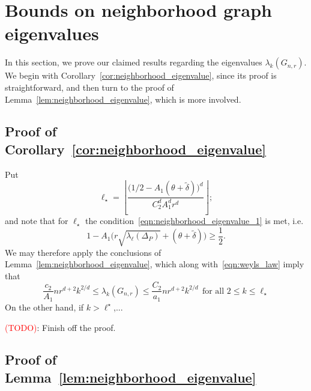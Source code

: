 \documentclass[twoside]{article}
\newcommand{\floor}[1]{\left\lfloor #1 \right\rfloor}
\newcommand{\1}{\mathbf{1}}
\newcommand{\wt}[1]{\widetilde{#1}}
\theoremstyle{definition}
\theoremstyle{remark}
\begin{document}
\section{Bounds on neighborhood graph eigenvalues}
\label{sec:graph_eigenvalues}
In this section, we prove our claimed results regarding the eigenvalues $\lambda_k(G_{n,r})$. We begin with Corollary~\ref{cor:neighborhood_eigenvalue}, since its proof is straightforward, and then turn to the proof of Lemma~\ref{lem:neighborhood_eigenvalue}, which is more involved.

\subsection{Proof of Corollary~\ref{cor:neighborhood_eigenvalue}}
Put
\begin{equation*}
\ell_{\star} = \floor{\frac{\bigl(1/2 - A_1(\theta + \wt{\delta})\bigr)^d}{C_2^d A_1^d r^d}};
\end{equation*}
and note that for $\ell_{\star}$ the condition~\eqref{eqn:neighborhood_eigenvalue_1} is met, i.e.
\begin{equation*}
1 - A_1\Biggl(r \sqrt{\lambda_{\ell}(\Delta_P)} + (\theta + \wt{\delta})\Biggr)  \geq \frac{1}{2}.
\end{equation*}
We may therefore apply the conclusions of Lemma~\ref{lem:neighborhood_eigenvalue}, which along with~\eqref{eqn:weyls_law} imply that
\begin{equation*}
\frac{c_2}{A_1} nr^{d + 2} k^{2/d} \leq \lambda_k(G_{n,r}) \leq \frac{C_2}{a_1} nr^{d + 2} k^{2/d}~~\textrm{for all $2 \leq k \leq \ell_{\star}$}
\end{equation*}
On the other hand, if $k > \ell^{\star}$,...

\textcolor{red}{(TODO)}: Finish off the proof.

\subsection{Proof of Lemma~\ref{lem:neighborhood_eigenvalue}}
\end{document}
